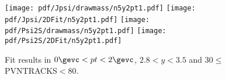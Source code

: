 \begin{figure}[H]
\begin{center}
\texttt{[image: pdf/Jpsi/drawmass/n5y2pt1.pdf]}
\texttt{[image: pdf/Jpsi/2DFit/n5y2pt1.pdf]}
\vspace*{-0.5cm}
\texttt{[image: pdf/Psi2S/drawmass/n5y2pt1.pdf]}
\texttt{[image: pdf/Psi2S/2DFit/n5y2pt1.pdf]}
\vspace*{-0.5cm}
\end{center}
\caption{Fit results in $0\gevc<pt<2\gevc$, $2.8<y<3.5$ and 30$\leq$PVNTRACKS$<$80.}
\label{Fitn5y2pt1}
\end{figure}
